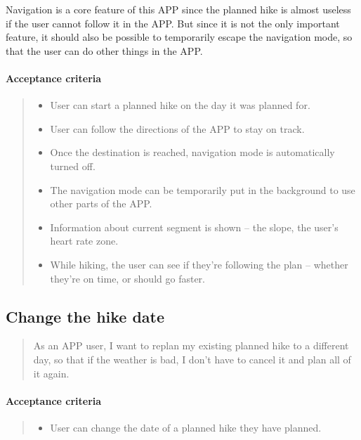 Navigation is a core feature of this APP since the planned hike is almost useless if the user cannot follow it in the APP.
But since it is not the only important feature, it should also be possible to temporarily escape the navigation mode, so that the user can do other things in the APP.

\paragraph*{Acceptance criteria}
\begin{quote}
\begin{itemize}
    \item User can start a planned hike on the day it was planned for.
    \item User can follow the directions of the APP to stay on track.
    \item Once the destination is reached, navigation mode is automatically turned off.
    \item The navigation mode can be temporarily put in the background to use other parts of the APP.
    \item Information about current segment is shown -- the slope, the user's heart rate zone.
    \item While hiking, the user can see if they're following the plan -- whether they're on time, or should go faster.
\end{itemize}
\end{quote}

\subsection{Change the hike date}\label{US:map-hike-change}
\begin{quote}
As an APP user, I want to replan my existing planned hike to a different day, so that if the weather is bad, I don't have to cancel it and plan all of it again.
\end{quote}

\paragraph*{Acceptance criteria}
\begin{quote}
\begin{itemize}
    \item User can change the date of a planned hike they have planned.
\end{itemize}
\end{quote}


